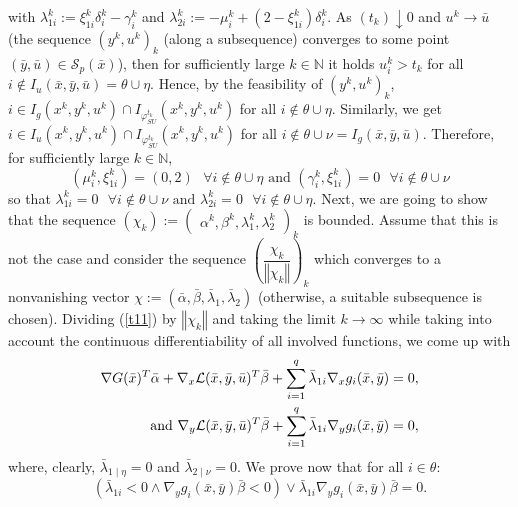	with $\lambda_{1i}^{k}:=\xi_{1i}^{k}\delta_{i}^{k}-\gamma_{i}^{k}$ and
	$\lambda_{2i}^{k}:=-\mu_{i}^{k}+(2-\xi_{1i}^{k})\delta_{i}^{k}$. 
	  As $(t_{k})\downarrow0$ and  $u^{k}\rightarrow\bar{u}$ (the sequence $(y^{k}
	,u^{k})_{k}$ (along a subsequence) converges to some point $(\bar{y},\bar
	{u})\in\mathcal{S}_{p}(\bar{x})$), 
	 then for sufficiently large $k\in\mathbb{N}$ it holds
	$u_{i}^{k}>t_{k}$ for all $i\notin I_{u}(\bar{x},\bar{y},\bar{u})=\theta
	\cup\eta$. Hence, by the feasibility of $(y^{k},u^{k})_{k}$, 	$i\in I_{g}(x^{k},y^{k},u^{k})\cap I_{\varphi^{t_{k}} _{SU}
	}(x^{k},y^{k},u^{k})$ for all $i\notin\theta\cup\eta.$ Similarly, we get $i\in I_{u}
	(x^{k},y^{k},u^{k})\cap I_{\varphi^{t_{k}} _{SU}
	}(x^{k},y^{k},u^{k})$ for all
	$i\notin\theta\cup\nu=I_{g}(\bar{x},\bar{y},\bar{u}).$ Therefore, for
	sufficiently large $k\in\mathbb{N}$,
	\[
	(\mu_{i}^{k},\xi_{1i}^{k})=(0,2)\text{\ \ \ }\forall i\notin\theta\cup
	\eta\text{ \ and \ }(\gamma_{i}^{k},\xi_{1i}^{k})=0\text{ \ \ }\forall
	i\notin\theta\cup\nu
	\]
	so that 
    $
	\lambda_{1i}^{k}=0\text{ }\forall i\notin\theta\cup\nu\text{\ \ and \ }%
	\lambda_{2i}^{k}=0\text{ }\forall i\notin\theta\cup\eta.
    $
    Next, we are going to show that the sequence $(\chi_{k}):=
	\begin{pmatrix}
	\alpha^{k},\beta^{k},\lambda_{1}^{k},\lambda_{2}^{k}
	\end{pmatrix}
	_{k}$ is bounded. Assume that this is not the case and consider the sequence
	$\left(  \dfrac{\chi_{k}}{\left\Vert \chi_{k}\right\Vert }\right)  _{k}$ which
	converges to a nonvanishing vector $\chi:=(\bar{\alpha},\bar{\beta}
	,\bar{\lambda}_{1},\bar{\lambda}_{2})$ (otherwise, a suitable subsequence is
	chosen). Dividing (\ref{t11}) by $\left\Vert \chi_{k}\right\Vert $ and taking
	the limit $k\rightarrow\infty$ while taking into account the continuous
	differentiability of all involved functions, we come up with
	\begin{align}
	\nabla G(\bar{x})^{T}\bar{\alpha}+\nabla_{x}\mathcal{L}(\bar{x},\bar{y}
	,\bar{u})^{T}\bar{\beta}+\sum\limits_{i=1}^{q}\bar{\lambda}_{1i}\nabla
	_{x}g_{i}(\bar{x},\bar{y})  & =0,\bigskip\label{t13}\\
	\mbox{ and }\nabla_{y}\mathcal{L}(\bar{x},\bar{y},\bar{u})^{T}\bar{\beta}
	+\sum\limits_{i=1}^{q}\bar{\lambda}_{1i}\nabla_{y}g_{i}(\bar{x},\bar{y})  &
	=0,\label{t14}%
	\end{align}
	where, clearly, $\bar{\lambda}_{1\mid\eta}=0$ and $\bar{\lambda}_{2\mid\nu}=0.$
	We prove now that for all $i\in\theta$: 
	\[
	(\bar{\lambda}_{1i}<0\wedge\nabla_{y}g_{i}(\bar{x},\bar{y})\bar{\beta}
	<0)\vee\bar{\lambda}_{1i}\nabla_{y}g_{i}(\bar{x},\bar{y})\bar{\beta}=0. 
	\]
